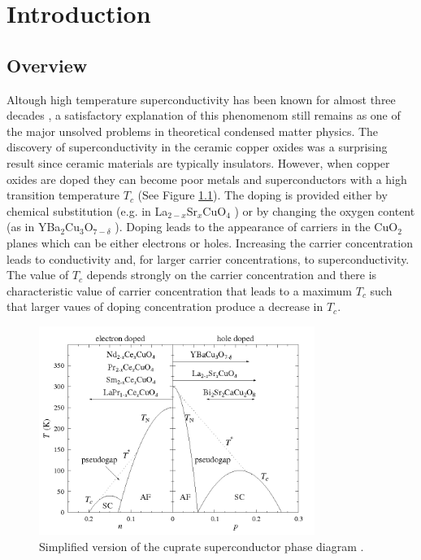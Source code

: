 \chapter{Introduction}
\label{chap:introduction}

\section{Overview}
\label{sec:overview}

Altough high temperature superconductivity has been known for almost three decades \cite{Bednorz1986}, a satisfactory explanation of this phenomenom still remains as one of the major unsolved problems in theoretical condensed matter physics. 
The discovery of superconductivity in the ceramic copper oxides was a surprising result since ceramic materials are typically insulators.
However, when copper oxides are doped they can become poor metals and superconductors with a high transition temperature $T_c$ (See Figure \ref{fig:CuPhaseDiag}). 
The doping is provided either by chemical substitution (e.g. in La$_{2-x}$Sr$_x$CuO$_4$ \cite{Cava1987}) or by changing the oxygen content (as in YBa$_2$Cu$_3$O$_{7-\delta}$ \cite{Wu1987}). 
Doping leads to the appearance of carriers in the CuO$_2$ planes which can be either electrons or holes.
Increasing the carrier concentration leads to conductivity and, for larger carrier concentrations, to superconductivity. 
The value of $T_c$ depends strongly on the carrier concentration and there is characteristic value of carrier concentration that leads to a maximum $T_c$ such that larger vaues of doping concentration produce a decrease in $T_c$.

\begin{figure}[ht]
  \centering
  \includegraphics[width=0.8\textwidth]{images/CuPhaseDiag.png}
  \caption[Simplified version of the cuprate superconductor phase diagram]
  {Simplified version of the cuprate superconductor phase diagram \protect\cite{CuPhaseDiag}.}
  \label{fig:CuPhaseDiag}
\end{figure}

